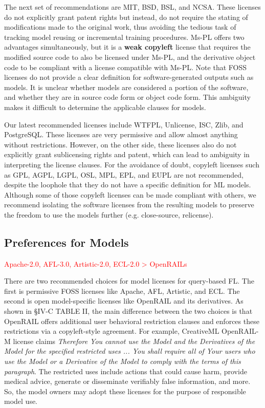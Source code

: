 \documentclass[journal]{IEEEtran}
\begin{document}
  The next set of recommendations are MIT, BSD, BSL, and NCSA. 
  These licenses do not explicitly grant patent rights but instead, do not require the stating of modifications made to the original work, thus avoiding the tedious task of tracking model reusing or incremental training procedures. 
  Ms-PL offers two advantages simultaneously, but it is a \textbf{weak copyleft} license that requires the modified source code to also be licensed under Ms-PL, and the derivative object code to be compliant with a license compatible with Ms-PL.
  Note that FOSS licenses do not provide a clear definition for software-generated outputs such as models. 
  It is unclear whether models are considered a portion of the software, and whether they are in source code form or object code form. 
  This ambiguity makes it difficult to determine the applicable clauses for models.
  
  Our latest recommended licenses include WTFPL, Unlicense, ISC, Zlib, and PostgreSQL.
  These licenses are very permissive and allow almost anything without restrictions.
  However, on the other side, these licenses also do not explicitly grant sublicensing rights and patent, which can lead to ambiguity in interpreting the license clauses.
  For the avoidance of doubt, copyleft licenses such as GPL, AGPL, LGPL, OSL, MPL, EPL, and EUPL are not recommended, despite the loophole that they do not have a specific definition for ML models.
  Although some of those copyleft licenses can be made compliant with others, we recommend isolating the software licenses from the resulting models to preserve the freedom to use the models further (e.g. close-source, relicense).
  
  \subsection{Preferences for Models}
  \noindent\textcolor{red}{Apache-2.0, AFL-3.0, Artistic-2.0, ECL-2.0 > OpenRAILs}
  
  There are two recommended choices for model licenses for query-based FL. 
  The first is permissive FOSS licenses like Apache, AFL, Artistic, and ECL. 
  The second is open model-specific licenses like OpenRAIL and its derivatives.
  As shown in \S{IV-C} TABLE II, the main difference between the two choices is that OpenRAIL offers additional user behavioral restriction clauses and enforces these restrictions via a copyleft-style agreement.
  For example, CreativeML OpenRAIL-M license claims \textit{Therefore You cannot use the Model and the Derivatives of the Model for the specified restricted uses ... You shall require all of Your users who use the Model or a Derivative of the Model to comply with the terms of this paragraph}.
  The restricted uses include actions that could cause harm, provide medical advice, generate or disseminate verifiably false information, and more.
  So, the model owners may adopt these licenses for the purpose of responsible model use.
\end{document}
